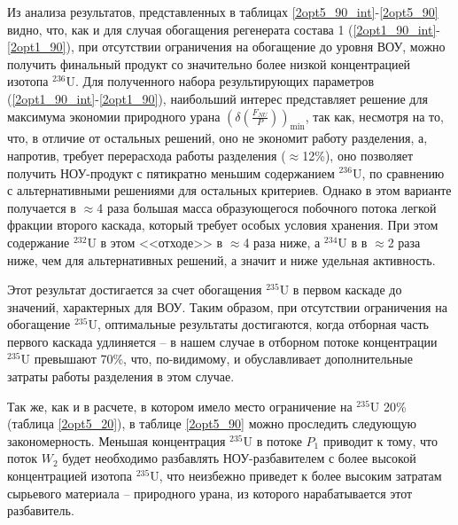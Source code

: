 Из анализа результатов, представленных в таблицах \ref{2opt5_90_int}-\ref{2opt5_90} видно, что, как и для случая обогащения регенерата состава 1 (\ref{2opt1_90_int}-\ref{2opt1_90}), при отсутствии ограничения на обогащение до уровня ВОУ, можно получить финальный продукт со значительно более низкой концентрацией изотопа $^{236}$U. Для полученного набора результирующих параметров (\ref{2opt1_90_int}-\ref{2opt1_90}), наибольший интерес представляет решение для максимума экономии природного урана $(\delta(\frac{F_{NU}}{P}))_\text{min}$, так как, несмотря на то, что, в отличие от остальных решений, оно не экономит работу разделения, а, напротив, требует перерасхода работы разделения ($\approx$12\%), оно позволяет получить НОУ-продукт с пятикратно меньшим содержанием $^{236}$U, по сравнению с альтернативными решениями для остальных критериев. Однако в этом варианте получается в $\approx$4 раза большая масса образующегося побочного потока легкой фракции второго каскада, который требует особых условия хранения. При этом содержание $^{232}$U в этом <<отходе>> в $\approx$4 раза ниже, а $^{234}$U в в $\approx$2 раза ниже, чем для альтернативных решений, а значит и ниже удельная активность.

Этот результат достигается за счет обогащения $^{235}$U в первом каскаде до значений, характерных для ВОУ. Таким образом, при отсутствии ограничения на обогащение $^{235}$U, оптимальные результаты достигаются, когда отборная часть первого каскада удлиняется -- в нашем случае в отборном потоке концентрации $^{235}$U превышают 70\%, что, по-видимому, и обуславливает дополнительные затраты работы разделения в этом случае.

Так же, как и в расчете, в котором имело место ограничение на $^{235}$U 20\% (таблица \ref{2opt5_20}), в таблице \ref{2opt5_90} можно проследить следующую закономерность. Меньшая концентрация $^{235}$U в потоке $P_{1}$ приводит к тому, что поток $W_{2}$ будет необходимо разбавлять НОУ-разбавителем с более высокой концентрацией изотопа $^{235}$U, что неизбежно приведет к более высоким затратам сырьевого материала -- природного урана, из которого нарабатывается этот разбавитель.



